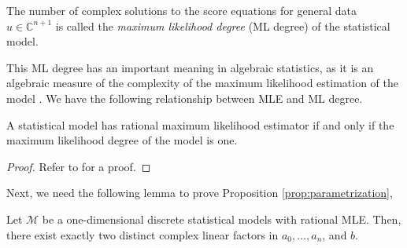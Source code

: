 \begin{definition}
    The number of complex solutions to the score equations for general data \( u \in \mathbb{C}^{n + 1} \) is called the \emph{maximum likelihood degree} (ML degree) of the statistical model. 
\end{definition}


This ML degree has an important meaning in algebraic statistics, as it is an algebraic measure of the complexity of the maximum likelihood estimation of the model \cite{amendola2019maximum, catanese2006maximum, sullivant2023algebraic}. We have the following relationship between MLE and ML degree.

\begin{proposition}\label{prop:rational-mle}
    A statistical model has rational maximum likelihood estimator if and only if the maximum likelihood degree of the model is one.
\end{proposition}

\begin{proof}
   Refer to \cite{duarte2021discrete} for a proof.
\end{proof}

Next, we need the following lemma to prove Proposition \ref{prop:parametrization},

\begin{lemma}\label{lem:two-complex-factors}
    Let \( \mathcal{M} \) be a one-dimensional discrete statistical models with rational MLE. Then, there exist exactly two distinct complex linear factors in \( a_0, \dots, a_n \), and \( b \).
\end{lemma}


